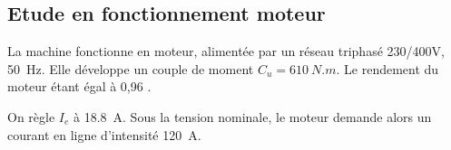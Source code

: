 \ifprof
\begin{corrige}


\end{corrige}
\else
\fi

\subsection*{Etude en fonctionnement moteur}

La machine fonctionne en moteur, alimentée par un réseau triphasé 230/400\si{V}, \SI{50}{Hz}. Elle développe un couple de moment $C_u= \SI{610}{N.m}$.
Le rendement du moteur étant égal à 0,96 . 

\ifprof
\begin{corrige}


\end{corrige}
\else
\fi

\ifprof
\begin{corrige}


\end{corrige}
\else
\fi

On règle $I_e$ à \SI{18,8}{A}. Sous la tension nominale, le moteur demande alors un courant en ligne d’intensité \SI{120}{A}. 

\ifprof
\begin{corrige}


\end{corrige}
\else
\fi


\ifprof
\else
\begin{marginfigure}[-3cm]
\centering
\end{marginfigure}
\fi




